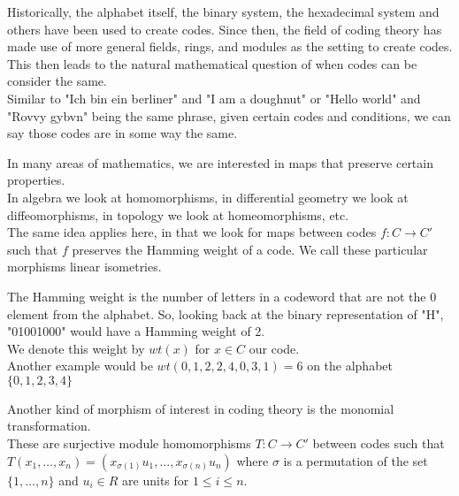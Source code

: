 \documentclass{beamer}
\begin{document}
\begin{frame}

    Historically, the alphabet itself, the binary system, the hexadecimal system and others have been
    used to create codes. Since then, the field of coding theory has made use of more general fields,
    rings, and modules as the setting to create codes.\\
    This then leads to the natural mathematical question of when codes can be consider the same.\\
    Similar to "Ich bin ein berliner" and "I am a doughnut" or "Hello world" and "Rovvy gybvn" being the
    same phrase, given certain codes and conditions, we can say those codes are in some way the same.
    
\end{frame}

\begin{frame}
    
    In many areas of mathematics, we are interested in maps that preserve certain properties.\\
    In algebra we look at homomorphisms, in differential geometry we look at diffeomorphisms, in
    topology we look at homeomorphisms, etc.\\
    The same idea applies here, in that we look for maps between codes $f:C\to C'$ such that $f$
    preserves the Hamming weight of a code. We call these particular morphisms linear isometries. 

\end{frame}

\begin{frame}
    
    The Hamming weight is the number of letters in a codeword that are not the $0$ element from the
    alphabet. So, looking back at the binary representation of "H", "01001000" would have a Hamming
    weight of 2.\\
    We denote this weight by $wt(x)$ for $x\in C$ our code.\\
    Another example would be $wt(0,1,2,2,4,0,3,1)=6$ on the alphabet $\{0,1,2,3,4\}$

\end{frame}

\begin{frame}
    
    Another kind of morphism of interest in coding theory is the monomial transformation.\\
    These are surjective module homomorphisms $T:C\to C'$ between codes such that
    $T(x_1,\ldots,x_n)=(x_{\sigma(1)}u_1,\ldots,x_{\sigma(n)}u_n)$ where $\sigma$ is a permutation of
    the set $\{1,\ldots,n\}$ and $u_i\in R$ are units for $1\leq i\leq n$.

\end{frame}
\end{document}
